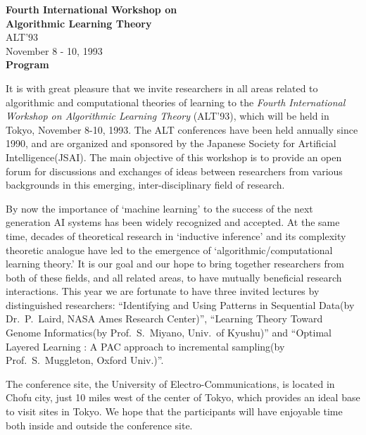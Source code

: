 \pagestyle{empty}


\begin{center}
  {\bf Fourth International Workshop on} \\
  {\bf Algorithmic Learning Theory} \\[2mm]
  {\sf ALT'93} \\[4mm]
  {\large November 8 - 10, 1993} \\
  {\Large\bf  Program}
\end{center}

\baselineskip=15pt

It is with great pleasure that we invite researchers in all areas 
related to algorithmic and computational theories of learning 
to the {\em Fourth International Workshop on Algorithmic Learning Theory}
(ALT'93), which will be held in Tokyo, November 8-10, 1993.  
The ALT conferences have been held annually since 1990, 
and are organized and sponsored by the Japanese Society 
for Artificial Intelligence(JSAI).  
The main objective of this workshop is to 
provide an open forum for discussions and exchanges of ideas 
between researchers from various backgrounds 
in this emerging, inter-disciplinary field of research. 

By now the importance of `machine learning' to the 
success of the next generation AI systems 
has been widely recognized and accepted. 
At the same time, decades of theoretical research in `inductive inference' 
and its complexity theoretic analogue have led to the emergence of 
`algorithmic/computational learning theory.'
It is our goal and our hope to bring together researchers from both 
of these fields, and all related areas, 
to have mutually beneficial research interactions. 
This year we are fortunate to have three invited 
lectures by distinguished researchers: 
 ``Identifying and Using Patterns in Sequential Data(by Dr.\ P.\ Laird, 
NASA Ames Research Center)'',  
 ``Learning Theory Toward Genome Informatics(by Prof.\ S.\ Miyano, 
Univ.\ of Kyushu)'' and ``Optimal Layered Learning : A PAC approach to
incremental sampling(by Prof.\ S.\ Muggleton, Oxford Univ.)''.   

The conference site,  the University of Electro-Communications, 
is located in Chofu city, just 10 miles west of the center of Tokyo,  
which provides an ideal base to visit sites in Tokyo.   
We hope that the participants  will have enjoyable 
time both inside  and outside the conference site.
\newpage


\footnotesize

